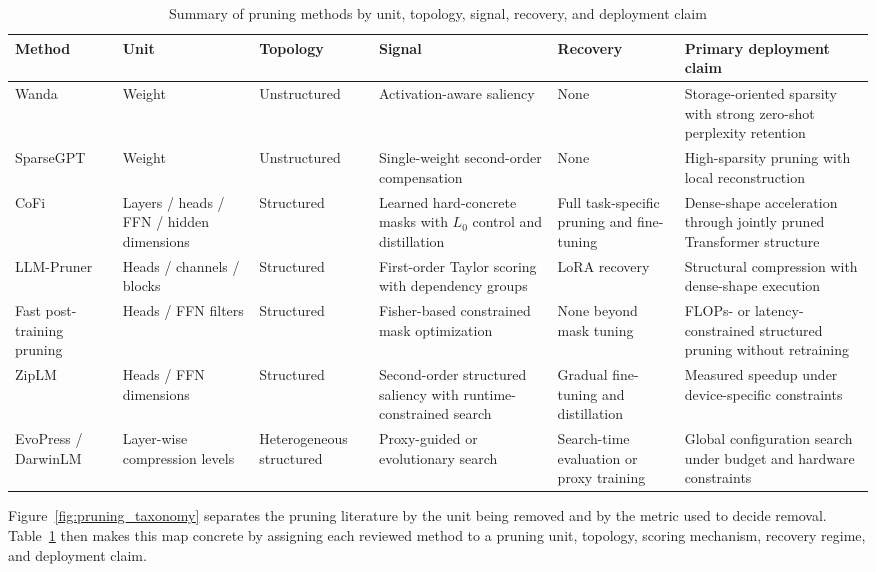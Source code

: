 \begin{table}[H]
	\centering
	\caption{Summary of pruning methods by unit, topology, signal, recovery, and deployment claim}
	\label{tab:pruning_taxonomy}
	\begin{tabularx}{\textwidth}{@{}l >{\raggedright\arraybackslash}X >{\raggedright\arraybackslash}X >{\raggedright\arraybackslash}X >{\raggedright\arraybackslash}X >{\raggedright\arraybackslash}X@{}}
		\toprule
		\textbf{Method} & \textbf{Unit} & \textbf{Topology} & \textbf{Signal} & \textbf{Recovery} & \textbf{Primary deployment claim} \\
		\midrule
		Wanda & Weight & Unstructured & Activation-aware saliency & None & Storage-oriented sparsity with strong zero-shot perplexity retention \\
		SparseGPT & Weight & Unstructured & Single-weight second-order compensation & None & High-sparsity pruning with local reconstruction \\
		CoFi & Layers / heads / FFN / hidden dimensions & Structured & Learned hard-concrete masks with $L_0$ control and distillation & Full task-specific pruning and fine-tuning & Dense-shape acceleration through jointly pruned Transformer structure \\
		LLM-Pruner & Heads / channels / blocks & Structured & First-order Taylor scoring with dependency groups & LoRA recovery & Structural compression with dense-shape execution \\
		Fast post-training pruning & Heads / FFN filters & Structured & Fisher-based constrained mask optimization & None beyond mask tuning & FLOPs- or latency-constrained structured pruning without retraining \\
		ZipLM & Heads / FFN dimensions & Structured & Second-order structured saliency with runtime-constrained search & Gradual fine-tuning and distillation & Measured speedup under device-specific constraints \\
		EvoPress / DarwinLM & Layer-wise compression levels & Heterogeneous structured & Proxy-guided or evolutionary search & Search-time evaluation or proxy training & Global configuration search under budget and hardware constraints \\
		\bottomrule
	\end{tabularx}
\end{table}

Figure~\ref{fig:pruning_taxonomy} separates the pruning literature by the unit being removed and by the metric used to decide removal. Table~\ref{tab:pruning_taxonomy} then makes this map concrete by assigning each reviewed method to a pruning unit, topology, scoring mechanism, recovery regime, and deployment claim.

